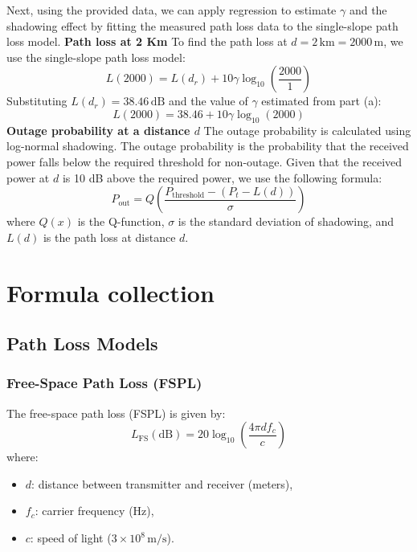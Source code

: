 \documentclass[a4paper,12pt]{book}
\begin{document}
	Next, using the provided data, we can apply regression to estimate \( \gamma \) and the shadowing effect by fitting the measured path loss data to the single-slope path loss model.
	\newline\newline\noindent
	\textbf{Path loss at 2 Km}
	\newline
	To find the path loss at \( d = 2 \, \text{km} = 2000 \, \text{m} \), we use the single-slope path loss model:
	\[
	L(2000) = L(d_r) + 10 \gamma \log_{10} \left( \frac{2000}{1} \right)
	\]
	Substituting \( L(d_r) = 38.46 \, \text{dB} \) and the value of \( \gamma \) estimated from part (a):
	\[
	L(2000) = 38.46 + 10 \gamma \log_{10}(2000)
	\]
	\noindent
	\textbf{Outage probability at a distance \( d \)}
	\newline
	The outage probability is calculated using log-normal shadowing. The outage probability is the probability that the received power falls below the required threshold for non-outage. Given that the received power at \( d \) is 10 dB above the required power, we use the following formula:
	\[
	P_{\text{out}} = Q \left( \frac{P_{\text{threshold}} - (P_t - L(d))}{\sigma} \right)
	\]
	where \( Q(x) \) is the Q-function, \( \sigma \) is the standard deviation of shadowing, and \( L(d) \) is the path loss at distance \( d \).
	
	\chapter{Formula collection}
	\section{Path Loss Models}
	
	\subsection{Free-Space Path Loss (FSPL)}
	The free-space path loss (FSPL) is given by:
	\[
	L_{\text{FS}}(\text{dB}) = 20 \log_{10} \left( \frac{4\pi d f_c}{c} \right)
	\]
	where:
	\begin{itemize}
		\item \( d \): distance between transmitter and receiver (meters),
		\item \( f_c \): carrier frequency (Hz),
		\item \( c \): speed of light (\( 3 \times 10^8 \, \text{m/s} \)).
	\end{itemize}
	
\end{document}
